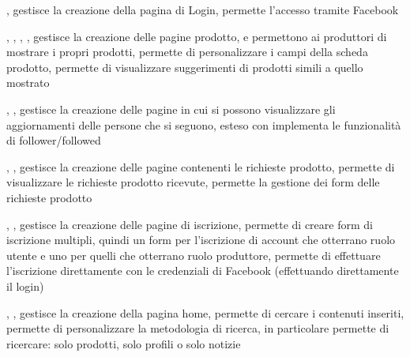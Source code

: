 
{, }
{ gestisce la creazione della pagina di Login,  permette l'accesso tramite Facebook}


{, , , , }
{ gestisce la creazione delle pagine prodotto,  e  permettono ai produttori di mostrare i propri prodotti,  permette di personalizzare i campi della scheda prodotto,  permette di visualizzare suggerimenti di prodotti simili a quello mostrato}


{, , }
{ gestisce la creazione delle pagine in cui si possono visualizzare gli aggiornamenti delle persone che si seguono,  esteso con  implementa le funzionalità di follower/followed}


{, , }
{ gestisce la creazione delle pagine contenenti le richieste prodotto,  permette di visualizzare le richieste prodotto ricevute,  permette la gestione dei form delle richieste prodotto}


{, , }
{ gestisce la creazione delle pagine di iscrizione,  permette di creare form di iscrizione multipli, quindi un form per l'iscrizione di account che otterrano ruolo utente e uno per quelli che otterrano ruolo produttore,  permette di effettuare l'iscrizione direttamente con le credenziali di Facebook (effettuando direttamente il login)}


{, , }
{ gestisce la creazione della pagina home,  permette di cercare i contenuti inseriti,  permette di personalizzare la metodologia di ricerca, in particolare permette di ricercare: solo prodotti, solo profili o solo notizie}

